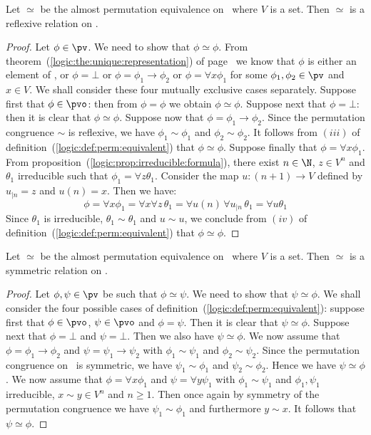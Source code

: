 \begin{prop}\label{logic:prop:perm:reflexive}
Let $\simeq$ be the almost permutation equivalence on \pv\ where $V$
is a set. Then $\simeq$ is a reflexive relation on \pv.
\end{prop}
\begin{proof}
Let $\phi\in\pv$. We need to show that $\phi\simeq\phi$. From
theorem~(\ref{logic:the:unique:representation}) of
page~\pageref{logic:the:unique:representation} we know that $\phi$
is either an element of \pvo, or $\phi=\bot$ or
$\phi=\phi_{1}\to\phi_{2}$ or $\phi=\forall x\phi_{1}$ for some
$\phi_{1},\phi_{2}\in\pv$ and $x\in V$. We shall consider these four
mutually exclusive cases separately. Suppose first that
$\phi\in\pvo$: then from $\phi=\phi$ we obtain $\phi\simeq\phi$.
Suppose next that $\phi=\bot$: then it is clear that
$\phi\simeq\phi$. Suppose now that $\phi=\phi_{1}\to\phi_{2}$. Since
the permutation congruence $\sim$ is reflexive, we have
$\phi_{1}\sim\phi_{1}$ and $\phi_{2}\sim\phi_{2}$. It follows from
$(iii)$ of definition~(\ref{logic:def:perm:equivalent}) that
$\phi\simeq\phi$. Suppose finally that $\phi=\forall x\phi_{1}$.
From proposition~(\ref{logic:prop:irreducible:formula}), there exist
$n\in\N$, $z\in V^{n}$ and $\theta_{1}$ irreducible such that
$\phi_{1}=\forall z\theta_{1}$. Consider the map $u:(n+1)\to V$
defined by $u_{|n}=z$ and $u(n)=x$. Then we have:
    \[
    \phi=\forall x\phi_{1}=\forall x\forall z\,\theta_{1}=\forall
    u(n)\,\forall u_{|n}\,\theta_{1}=\forall u\theta_{1}
    \]
Since $\theta_{1}$ is irreducible, $\theta_{1}\sim\theta_{1}$ and
$u\sim u$, we conclude from $(iv)$ of
definition~(\ref{logic:def:perm:equivalent}) that $\phi\simeq\phi$.
\end{proof}
\begin{prop}\label{logic:prop:perm:symmetric}
Let $\simeq$ be the almost permutation equivalence on \pv\ where $V$
is a set. Then $\simeq$ is a symmetric relation on \pv.
\end{prop}
\begin{proof}
Let $\phi,\psi\in\pv$ be such that $\phi\simeq\psi$. We need to show
that $\psi\simeq\phi$. We shall consider the four possible cases of
definition~(\ref{logic:def:perm:equivalent}): suppose first that
$\phi\in\pvo$, $\psi\in\pvo$ and $\phi=\psi$. Then it is clear that
$\psi\simeq\phi$. Suppose next that $\phi=\bot$ and $\psi=\bot$.
Then we also have $\psi\simeq\phi$. We now assume that
$\phi=\phi_{1}\to\phi_{2}$ and $\psi=\psi_{1}\to\psi_{2}$ with
$\phi_{1}\sim\psi_{1}$ and $\phi_{2}\sim\psi_{2}$. Since the
permutation congruence on \pv\ is symmetric, we have
$\psi_{1}\sim\phi_{1}$ and $\psi_{2}\sim\phi_{2}$. Hence we have
$\psi\simeq\phi$. We now assume that $\phi=\forall x\phi_{1}$ and
$\psi=\forall y\psi_{1}$ with $\phi_{1}\sim\psi_{1}$ and
$\phi_{1},\psi_{1}$ irreducible, $x\sim y\in V^{n}$ and $n\geq 1$.
Then once again by symmetry of the permutation congruence we have
$\psi_{1}\sim\phi_{1}$ and furthermore $y\sim x$. It follows that
$\psi\simeq\phi$.
\end{proof}

